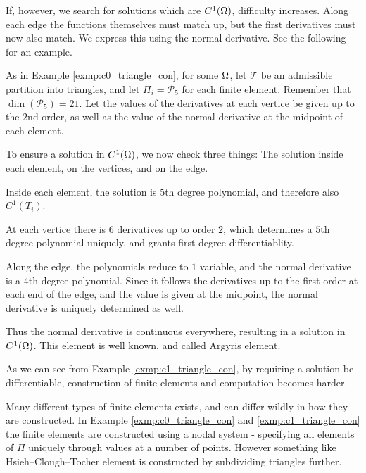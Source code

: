 If, however, we search for solutions which 
are $C^1(\Omega)$, difficulty increases. Along each edge the functions 
themselves must match up, but the first derivatives must now also match. 
We express this using the normal derivative. 
See the following for an example.
\begin{exmp}{\quad\label{exmp:c1_triangle_con}}
   As in Example \ref{exmp:c0_triangle_con}, 
    for some $\Omega$, let $\mathcal{T}$ be an admissible partition into 
    triangles, and let $\Pi_i = \mathcal{P}_5$ for each finite element.
    Remember that $\dim(\mathcal{P}_5) = 21$.
    Let the values of the derivatives at each vertice be given up 
    to the $2$nd order, as well as the value of the normal derivative at the 
    midpoint of each element.
    
    To ensure a solution in $C^1(\Omega)$, 
    we now check three things: The solution inside each element, 
    on the vertices, and on the edge.

    Inside each element, the solution is $5$th degree polynomial, 
    and therefore also $C^1(T_i)$.

    At each vertice there is $6$ derivatives up to order $2$, which 
    determines a $5$th degree polynomial uniquely, and grants first 
    degree differentiablity.

    Along the edge, the polynomials reduce to $1$ variable, and the 
    normal derivative is a $4$th degree polynomial. Since it follows 
    the derivatives up to the first order at each end of the edge, and 
    the value is given at the midpoint, the normal derivative is uniquely 
    determined as well.

    Thus the normal derivative is continuous everywhere, resulting in a 
    solution in $C^1(\Omega)$. This element is well known, and called 
    Argyris element.
\end{exmp}
As we can see from Example \ref{exmp:c1_triangle_con}, by requiring a 
solution be differentiable, construction of finite elements and computation 
becomes harder. 

Many different types of finite elements exists, and can differ wildly in how they 
are constructed. In Example \ref{exmp:c0_triangle_con} and \ref{exmp:c1_triangle_con} 
the finite elements are constructed using a nodal system - specifying all elements of $\Pi$ 
uniquely through values at a number of points. However something like Hsieh–Clough–Tocher element 
is constructed by subdividing triangles further.

